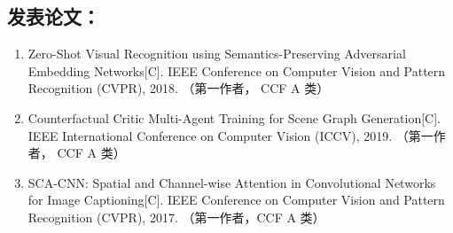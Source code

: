 \begin{publications}



 

\section*{发表论文：}
\begin{enumerate}
\item{
Zero-Shot Visual Recognition using Semantics-Preserving Adversarial Embedding Networks[C].
IEEE Conference on Computer Vision and Pattern Recognition (CVPR), 2018.
（第一作者， CCF A 类）
}

\item{
Counterfactual Critic Multi-Agent Training for Scene Graph Generation[C].
IEEE International Conference on Computer Vision (ICCV), 2019.
（第一作者， CCF A 类）
}

\item{
SCA-CNN: Spatial and Channel-wise Attention in Convolutional Networks for Image Captioning[C].
IEEE Conference on Computer Vision and Pattern Recognition (CVPR), 2017.
（第一作者，CCF A 类）
}


\end{enumerate}
\end{publications}
